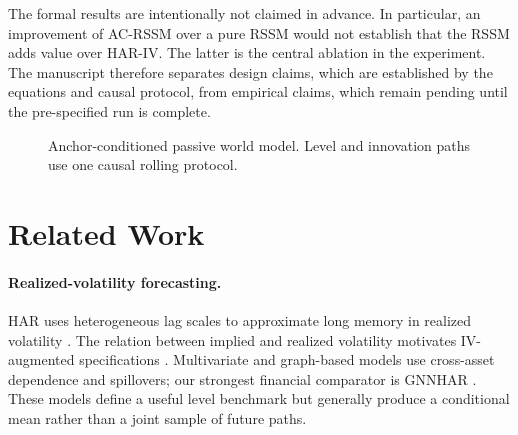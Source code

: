 \documentclass[11pt]{article}
\begin{document}
The formal results are intentionally not claimed in advance. In particular, an improvement of AC-RSSM over a pure RSSM would not establish that the RSSM adds value over HAR-IV. The latter is the central ablation in the experiment. The manuscript therefore separates design claims, which are established by the equations and causal protocol, from empirical claims, which remain pending until the pre-specified run is complete.

\begin{figure}[t]
\centering
{}
\caption{Anchor-conditioned passive world model. Level and innovation paths use one causal rolling protocol.}
\label{fig:architecture}
\end{figure}

\section{Related Work}

\paragraph{Realized-volatility forecasting.} HAR uses heterogeneous lag scales to approximate long memory in realized volatility \cite{corsi2009}. The relation between implied and realized volatility motivates IV-augmented specifications \cite{christensen1998}. Multivariate and graph-based models use cross-asset dependence and spillovers; our strongest financial comparator is GNNHAR \cite{zhang2025}. These models define a useful level benchmark but generally produce a conditional mean rather than a joint sample of future paths.
\end{document}

